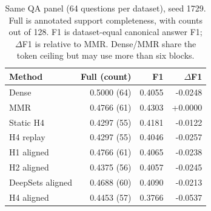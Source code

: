 \begin{table}[t]\centering\small
\caption{Same QA panel (64 questions per dataset), seed 1729. Full is annotated support completeness, with counts out of 128. F1 is dataset-equal canonical answer F1; $\Delta$F1 is relative to MMR. Dense/MMR share the token ceiling but may use more than six blocks.}
\label{tab:qa}
\begin{tabular}{lrrr}\toprule
Method & Full (count) & F1 & $\Delta$F1\\\midrule
Dense & 0.5000 (64) & 0.4055 & -0.0248\\
MMR & 0.4766 (61) & 0.4303 & +0.0000\\
Static H4 & 0.4297 (55) & 0.4181 & -0.0122\\
H4 replay & 0.4297 (55) & 0.4046 & -0.0257\\
H1 aligned & 0.4766 (61) & 0.4065 & -0.0238\\
H2 aligned & 0.4375 (56) & 0.4057 & -0.0245\\
DeepSets aligned & 0.4688 (60) & 0.4090 & -0.0213\\
H4 aligned & 0.4453 (57) & 0.3766 & -0.0537\\
\bottomrule\end{tabular}\end{table}
